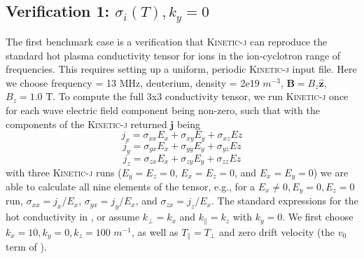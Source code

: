 \documentclass[final,5p,times,twocolumn]{elsarticle}
\let\oldhat\hat
\renewcommand{\vec}[1]{\mathbf{#1}}
\renewcommand{\hat}[1]{\oldhat{\mathbf{#1}}}
\newcommand{\kj}{\textsc{Kinetic-j}\xspace}
\begin{document}
\subsection{Verification 1: $\sigma_i\left(T\right), k_{y}=0$}
\label{section:verification1}
%
The first benchmark case is a verification that \kj can reproduce the standard hot plasma conductivity tensor for ions in the ion-cyclotron range of frequencies. This requires setting up a uniform, periodic \kj input file. Here we choose frequency = 13 MHz, deuterium, density = 2e19 $m^{-3}$, $\vec{B}=B_z\hat{\vec{z}}$, $B_z=1.0$ T. To compute the full 3x3 conductivity tensor, we run \kj once for each wave electric field component being non-zero, such that with the components of the \kj returned $\vec{j}$ being 
%
\begin{equation} 
j_x = \sigma_{xx}E_x+\sigma_{xy}E_y+\sigma_{xz}Ez
\end{equation}
\begin{equation} 
j_y = \sigma_{yx}E_x+\sigma_{yy}E_y+\sigma_{yz}Ez
\end{equation}
\begin{equation} 
j_z = \sigma_{zx}E_x+\sigma_{zy}E_y+\sigma_{zz}Ez
\end{equation}
%
with three \kj runs ($E_y=E_z=0$, $E_x=E_z=0$, and $E_x=E_y=0$) we are able to calculate all nine elements of the tensor, e.g., for a $E_x\ne0,E_y=0,E_z=0$ run, $\sigma_{xx}=j_x/E_x$, $\sigma_{yx}=j_y/E_x$, and $\sigma_{zx}=j_z/E_x$. The standard expressions for the hot conductivity in \cite[pg. 255 of ][]{brambilla}, or \cite[pg. 176 of][]{swanson} assume $k_\perp=k_x$ and $k_\parallel=k_z$ with $k_y=0$. We first choose $k_x=10,k_y=0,k_z=100$ $m^{-1}$, as well as $T_\parallel=T_\perp$ and zero drift velocity (the $v_0$ term of \cite{swanson}).
\end{document}
